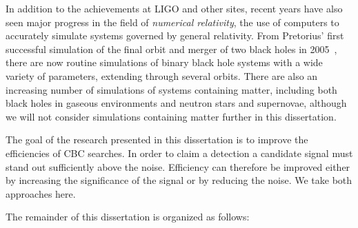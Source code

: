 In addition to the achievements at LIGO and other sites, recent years
have also seen major progress in the field of \emph{numerical
relativity}, the use of computers to accurately simulate systems
governed by general relativity.  From Pretorius' first successful
simulation of the final orbit and merger of two black holes in
2005~\cite{Pretorius:2005gq}, there are now routine simulations of
binary black hole systems with a wide variety of parameters, extending
through several orbits.  There are also an increasing number of
simulations of systems containing matter, including both black holes
in gaseous environments and neutron stars and supernovae, although we
will not consider simulations containing matter further in this
dissertation.


The goal of the research presented in this dissertation is to improve
the efficiencies of CBC searches.  In order to claim a detection a
candidate signal must stand out sufficiently above the noise.
Efficiency can therefore be improved either by increasing the
significance of the signal or by reducing the noise.  We take both
approaches here.

The remainder of this dissertation is organized as follows:

